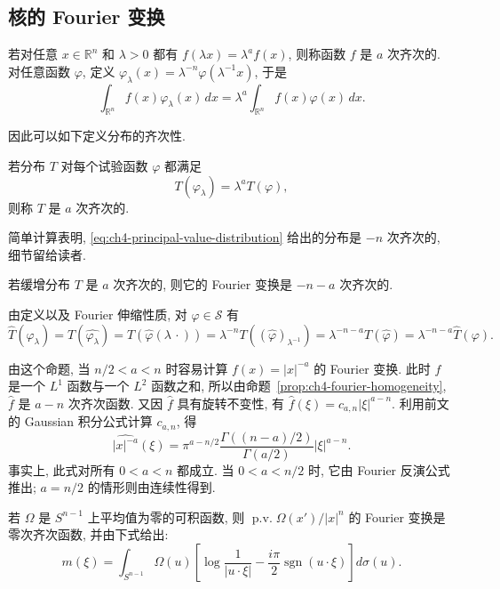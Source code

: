 \subsection{核的 Fourier 变换}
\label{sec:ch4-fourier-transform-kernel}

若对任意 $x\in\mathbb R^n$ 和 $\lambda>0$ 都有 $f(\lambda x)=\lambda^a f(x)$, 则称函数 $f$ 是 $a$ 次齐次的. 对任意函数 $\varphi$, 定义 $\varphi_\lambda(x)=\lambda^{-n}\varphi(\lambda^{-1}x)$, 于是
\[
 \int_{\mathbb R^n}f(x)\varphi_\lambda(x)\,dx
 =\lambda^a\int_{\mathbb R^n}f(x)\varphi(x)\,dx.
\]

\hypertarget{chapter-04-page-083}{}
因此可以如下定义分布的齐次性.

\begin{Definition}
\label{def:ch4-homogeneous-distribution}
若分布 $T$ 对每个试验函数 $\varphi$ 都满足
\[
 T(\varphi_\lambda)=\lambda^aT(\varphi),
\]
则称 $T$ 是 $a$ 次齐次的.
\end{Definition}

简单计算表明, \eqref{eq:ch4-principal-value-distribution} 给出的分布是 $-n$ 次齐次的, 细节留给读者.

\begin{Proposition}
\label{prop:ch4-fourier-homogeneity}
若缓增分布 $T$ 是 $a$ 次齐次的, 则它的 Fourier 变换是 $-n-a$ 次齐次的.
\end{Proposition}

\begin{Proof}
由定义以及 Fourier 伸缩性质, 对 $\varphi\in\mathcal S$ 有
\[
 \widehat T(\varphi_\lambda)=T(\widehat{\varphi_\lambda})
 =T(\widehat\varphi(\lambda\,\cdot))
 =\lambda^{-n}T((\widehat\varphi)_{\lambda^{-1}})
 =\lambda^{-n-a}T(\widehat\varphi)
 =\lambda^{-n-a}\widehat T(\varphi).
\]
\end{Proof}

由这个命题, 当 $n/2<a<n$ 时容易计算 $f(x)=|x|^{-a}$ 的 Fourier 变换. 此时 $f$ 是一个 $L^1$ 函数与一个 $L^2$ 函数之和, 所以由命题~\ref{prop:ch4-fourier-homogeneity}, $\widehat f$ 是 $a-n$ 次齐次函数. 又因 $\widehat f$ 具有旋转不变性, 有 $\widehat f(\xi)=c_{a,n}|\xi|^{a-n}$. 利用前文的 Gaussian 积分公式计算 $c_{a,n}$, 得
\begin{equation}
\label{eq:ch4-fourier-power-kernel}
 \widehat{|x|^{-a}}(\xi)
 =\pi^{a-n/2}\frac{\Gamma((n-a)/2)}{\Gamma(a/2)}|\xi|^{a-n}.
\end{equation}
事实上, 此式对所有 $0<a<n$ 都成立. 当 $0<a<n/2$ 时, 它由 Fourier 反演公式推出; $a=n/2$ 的情形则由连续性得到.

\hypertarget{chapter-04-page-084}{}
\begin{Theorem}
\label{thm:ch4-fourier-principal-value-kernel}
若 $\Omega$ 是 $S^{n-1}$ 上平均值为零的可积函数, 则 $\operatorname{p.v.}\Omega(x')/|x|^n$ 的 Fourier 变换是零次齐次函数, 并由下式给出:
\begin{equation}
\label{eq:ch4-principal-value-multiplier}
 m(\xi)=\int_{S^{n-1}}\Omega(u)
 \left[\log\frac1{|u\cdot\xi|}-\frac{i\pi}{2}
 \operatorname{sgn}(u\cdot\xi)\right]d\sigma(u).
\end{equation}
\end{Theorem}

